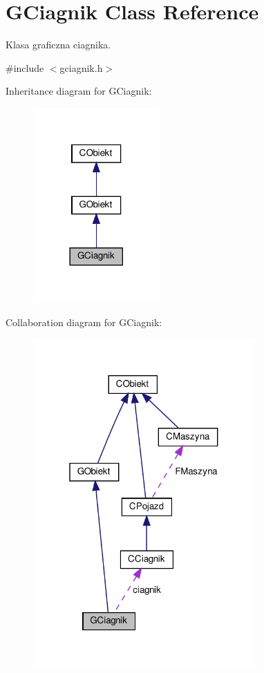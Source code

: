 \hypertarget{class_g_ciagnik}{}\section{G\+Ciagnik Class Reference}
\label{class_g_ciagnik}


Klasa graficzna ciagnika.  




{\ttfamily \#include $<$gciagnik.\+h$>$}



Inheritance diagram for G\+Ciagnik\+:\nopagebreak
\begin{figure}[H]
\begin{center}
\leavevmode
\includegraphics[width=137pt]{class_g_ciagnik__inherit__graph}
\end{center}
\end{figure}


Collaboration diagram for G\+Ciagnik\+:\nopagebreak
\begin{figure}[H]
\begin{center}
\leavevmode
\includegraphics[width=241pt]{class_g_ciagnik__coll__graph}
\end{center}
\end{figure}
